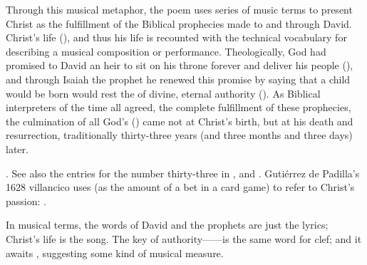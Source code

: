 Through this musical metaphor, the poem uses series of music terms
to present Christ as the fulfillment of the Biblical prophecies made to and
through David.
Christ's life  (), and
thus his life is recounted with the technical vocabulary for describing a
musical composition or performance.
Theologically, God had promised to David an heir to sit on his throne forever
and deliver his people (), and through Isaiah the prophet
he renewed this promise by saying that a child would be born  would rest the  of divine, eternal authority
().
As Biblical interpreters of the time all agreed, the complete fulfillment of
these prophecies, the culmination of all God's  () came not at Christ's birth, but at his death and
resurrection, traditionally thirty-three years (and three months and three days)
later.%
\begin{Footnote}
    \Autocite[17]{Lapide:Gospels19C}.
    See also the entries for the number thirty-three in
    \autocite{Ricciardo:CommentariaSymbolica}, and
    \autocite{Bongo:NumerorumMysteria}.
    Gutiérrez de Padilla's 1628 villancico  uses  (as the amount of a bet in a
    card game) to refer to Christ's passion: \autocite{Cashner:Cards}.
\end{Footnote}
In musical terms, the words of David and the prophets are just the lyrics;
Christ's life is the song.
The key of authority------is the same word for clef; and it awaits
, suggesting some kind of musical measure.

